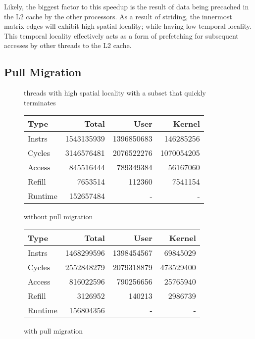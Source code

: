 \documentclass[11pt]{article}
\begin{document}
Likely, the biggest factor to this speedup is the result of data being precached in the L2 cache by the other processors.  As a result of striding, the innermost matrix edges will exhibit high spatial locality; while having low temporal locality.  This temporal locality effectively acts as a form of prefetching for subsequent accesses by other threads to the L2 cache.

\subsection{Pull Migration}
\begin{figure*}[!h]
	\caption{threads with high spatial locality with a subset that quickly terminates}	
	\label{fig:pull-stream-high}			
	\centering
	\begin{subtable}{.48\linewidth}
		\centering                 
		\begin{tabular}{l|rrr}
			Type    & Total      & User       & Kernel     \\
			\hline
			Instrs  & 1543135939 & 1396850683 & 146285256  \\ 
			Cycles  & 3146576481 & 2076522276 & 1070054205 \\ 
			Access  & 845516444  & 789349384  & 56167060   \\ 
			Refill  & 7653514    & 112360     & 7541154    \\ 
			Runtime & 152657484  & -          & -          \\
			\hline 
		\end{tabular}
		\caption{without pull migration}
	\end{subtable}
	\hfill
	\begin{subtable}{.48\linewidth}
		\begin{tabular}{l|rrr}
			Type    & Total      & User       & Kernel    \\
			\hline
			Instrs  & 1468299596 & 1398454567 & 69845029  \\ 
			Cycles  & 2552848279 & 2079318879 & 473529400 \\ 
			Access  & 816022596  & 790256656  & 25765940  \\ 
			Refill  & 3126952    & 140213     & 2986739   \\ 
			Runtime & 156804356  & -          & -         \\
			\hline
		\end{tabular}
		\caption{with pull migration}
	\end{subtable}
\end{figure*}
\end{document}

